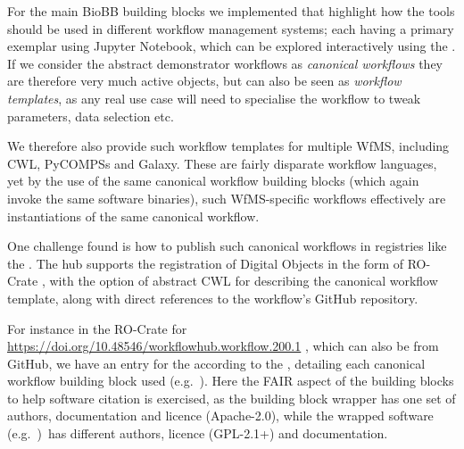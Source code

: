 For the main BioBB building blocks we implemented  that highlight how the tools should be used in different workflow management systems; each having a primary exemplar using Jupyter Notebook, which can be explored interactively using the .
If we consider the abstract demonstrator workflows as \emph{canonical workflows} they are therefore very much active objects, but can also be seen as \emph{workflow templates}, as any real use case will need to specialise the workflow to tweak parameters, data selection etc.

We therefore also provide such workflow templates for multiple WfMS, including CWL, PyCOMPSs and Galaxy.
These are fairly disparate workflow languages, yet by the use of the same canonical workflow building blocks (which again invoke the same software binaries), such WfMS-specific workflows effectively are instantiations of the same canonical workflow.

One challenge found is how to publish such canonical workflows in registries like the .
The hub supports the registration of Digital Objects in the form of \acrshort{RO-Crate} \cite{Soiland-Reyes 2022a}, with the option of abstract CWL for describing the canonical workflow template, along with direct references to the workflow's GitHub repository.

\clearpage %
For instance in the RO-Crate for \url{https://doi.org/10.48546/workflowhub.workflow.200.1} \cite{Hospital 2021a}, which can also be
 from GitHub, we have an entry for the 
according to the
, 
detailing each canonical workflow building block used 
(e.g.~).
Here the FAIR aspect of the building blocks to help software citation is exercised, as the building block wrapper has one set of authors, documentation and licence (Apache-2.0), while the wrapped software 
(e.g.~)~has different authors, licence (GPL-2.1+) and documentation.

